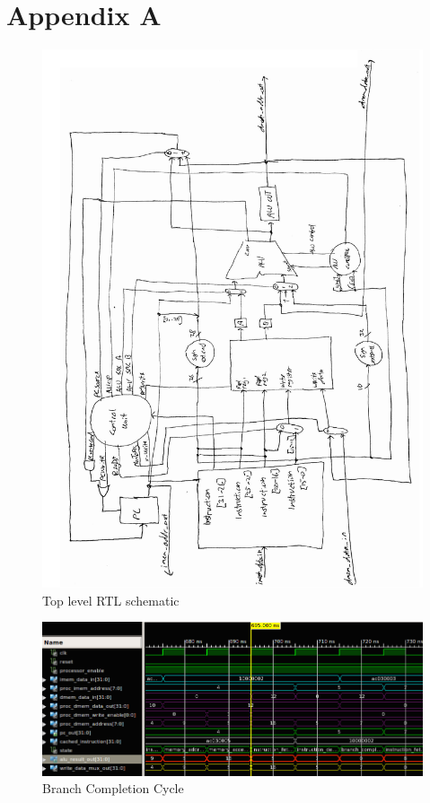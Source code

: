 \section{Appendix A}

\begin{figure}[ht!]
    \begin{center}
    \includegraphics[width=\textwidth]{assets/top_level_rtl.pdf}
    \caption{Top level RTL schematic}
    \label{fig:top_level_rtl}
    \end{center}
\end{figure}

\begin{figure}[ht!]
    \begin{center}
    \includegraphics[width=\textwidth]{assets/isim/branch_completion_cycle.png}
    \caption{Branch Completion Cycle}
    \label{fig:branch_completion_cycle}
    \end{center}
\end{figure}

